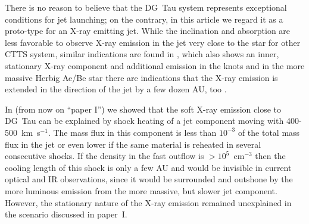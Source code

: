 There is no reason to believe that the DG~Tau system represents exceptional conditions for jet launching; on the contrary, in this article we regard it as a proto-type for an X-ray emitting jet. While the inclination and absorption are less favorable to observe X-ray emission in the jet very close to the star for other CTTS system, similar indications are found in  , which also shows an inner, stationary X-ray component and additional emission in the knots \citep{2010A&A...511A..42B,2011A&A...530A.123S} and in the more massive Herbig Ae/Be star  there are indications that the X-ray emission is extended in the direction of the jet by a few dozen AU, too \citep{2005ApJ...628..811S,2013A&A...552A.142G}.

In \citet{2009A&A...493..579G} (from now on ``paper I'') we showed that the soft X-ray emission close to DG~Tau can be explained by shock heating of a jet component moving with 400-500~km~s$^{-1}$. The mass flux in this component is less than $10^{-3}$ of the total mass flux in the jet or even lower if the same material is reheated in several consecutive shocks. If the density in the fast outflow is $>10^5$~cm$^{-3}$ then the cooling length of this shock is only a few AU and would be invisible in current optical and IR observations, since it would be surrounded and outshone by the more luminous emission from the more massive, but slower jet component. However, the stationary nature of the X-ray emission remained unexplained in the scenario discussed in paper~I.
